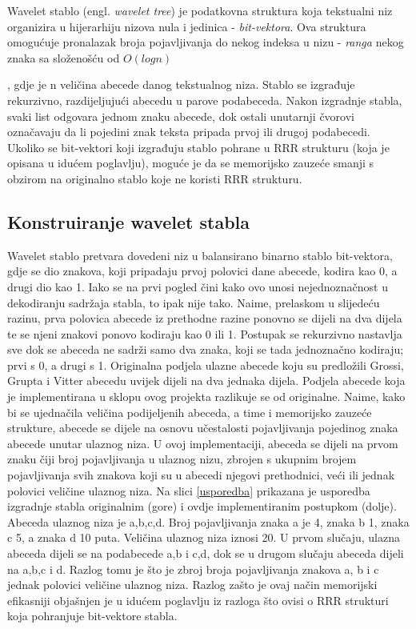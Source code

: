 Wavelet stablo (engl. \textit{wavelet tree}) je podatkovna struktura koja tekstualni niz organizira u hijerarhiju nizova nula i jedinica - \textit{bit-vektora}. Ova struktura omogućuje pronalazak broja pojavljivanja do nekog indeksa u nizu - \textit{ranga} nekog znaka sa složenošću od $O(log n)$


, gdje je n veličina abecede danog tekstualnog niza. 
Stablo se izgrađuje rekurzivno, razdijeljujući abecedu u parove podabeceda. Nakon izgradnje stabla, svaki list odgovara jednom znaku abecede, dok ostali unutarnji čvorovi označavaju da li pojedini znak teksta pripada prvoj ili drugoj podabecedi.
Ukoliko se bit-vektori koji izgrađuju stablo pohrane u RRR strukturu (koja je opisana u idućem poglavlju), moguće je da se memorijsko zauzeće smanji s obzirom na originalno stablo koje ne koristi RRR strukturu.


\subsection{Konstruiranje wavelet stabla}

Wavelet stablo pretvara dovedeni niz u balansirano binarno stablo bit-vektora, gdje se dio znakova, koji pripadaju prvoj polovici dane abecede, kodira kao 0, a drugi dio kao 1. Iako se na prvi pogled čini kako ovo unosi nejednoznačnost u dekodiranju sadržaja stabla, to ipak nije tako. Naime, prelaskom u slijedeću razinu, prva polovica abecede iz prethodne razine ponovno se dijeli na dva dijela te se njeni znakovi ponovo kodiraju kao 0 ili 1. Postupak se rekurzivno nastavlja sve dok se abeceda ne sadrži samo dva znaka, koji se tada jednoznačno kodiraju; prvi s 0, a drugi s 1. 
Originalna podjela ulazne abecede koju su predložili Grossi, Grupta i Vitter \cite{wavelet}  abecedu uvijek dijeli na dva jednaka dijela. Podjela abecede koja je implementirana u sklopu ovog projekta razlikuje se od originalne. Naime, kako bi se ujednačila veličina podijeljenih abeceda, a time i memorijsko zauzeće strukture, abecede se dijele na osnovu učestalosti pojavljivanja pojedinog znaka abecede unutar ulaznog niza. U ovoj implementaciji, abeceda se dijeli na prvom znaku čiji broj pojavljivanja u ulaznog nizu, zbrojen s ukupnim brojem pojavljivanja svih znakova koji su u abecedi njegovi prethodnici, veći ili jednak polovici veličine ulaznog niza.
Na slici \ref{usporedba} prikazana je usporedba izgradnje stabla originalnim (gore) i ovdje implementiranim postupkom (dolje). Abeceda ulaznog niza je {a,b,c,d}. Broj pojavljivanja znaka a je 4, znaka b 1, znaka c 5, a znaka d 10 puta. Veličina ulaznog niza iznosi 20. U prvom slučaju, ulazna abeceda dijeli se na podabecede {a,b} i {c,d}, dok se u drugom slučaju abeceda dijeli na {a,b,c} i {d}. Razlog tomu je što je zbroj broja pojavljivanja znakova a, b i c jednak polovici veličine ulaznog niza.
Razlog zašto je ovaj način memorijski efikasniji objašnjen je u idućem poglavlju iz razloga što ovisi o RRR strukturi koja pohranjuje bit-vektore stabla.


